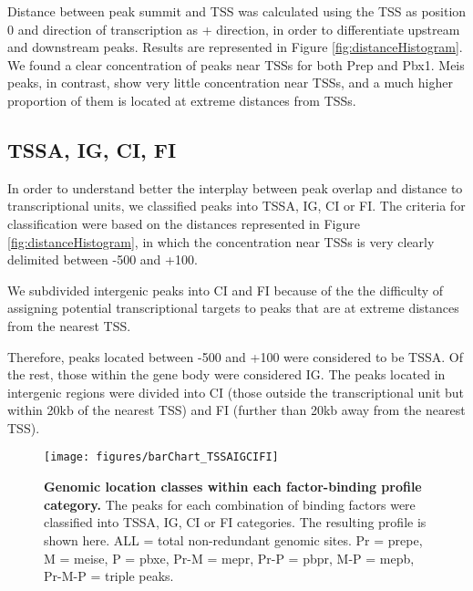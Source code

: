 Distance between peak summit and \ac{TSS} was calculated using the \ac{TSS} as position 0 and direction of transcription as + direction, in order to differentiate upstream and downstream peaks. Results are represented in Figure \ref{fig:distanceHistogram}. We found a clear concentration of peaks near \ac{TSS}s for both Prep and Pbx1. Meis peaks, in contrast, show very little concentration near \acp{TSS}, and a much higher proportion of them is located at extreme distances from \acp{TSS}. 

\subsection{TSSA, IG, CI, FI}

In order to understand better the interplay between peak overlap and distance to transcriptional units, we classified peaks into \ac{TSSA}, \ac{IG}, \ac{CI} or \ac{FI}. The criteria for classification were based on the  distances represented in Figure \ref{fig:distanceHistogram}, in which the concentration near \acp{TSS} is very clearly delimited between -500 and +100. 

We subdivided intergenic peaks into \ac{CI} and \ac{FI} because of the the difficulty of assigning potential transcriptional targets to peaks that are at extreme distances from the nearest \ac{TSS}.%

Therefore, peaks located between -500 and +100 were considered to be \ac{TSSA}. Of the rest, those within the gene body were considered \ac{IG}. The peaks located in intergenic regions were divided into \ac{CI} (those outside the transcriptional unit but within 20kb of the nearest \ac{TSS}) and \ac{FI} (further than 20kb away from the nearest \ac{TSS}). 

\begin{figure}[]
  \centering
  \texttt{[image: figures/barChart\_TSSAIGCIFI]}
  \caption[Genomic location classes within each factor-binding profile category]{\textbf{Genomic location classes within each factor-binding profile category.} The peaks for each combination of binding factors were classified into \ac{TSSA}, \ac{IG}, \ac{CI} or \ac{FI} categories. The resulting profile is shown here. ALL = total non-redundant genomic sites. Pr = \ac{prepe}, M = \ac{meise}, P = \ac{pbxe}, Pr-M = \ac{mepr}, Pr-P = \ac{pbpr}, M-P = \ac{mepb}, Pr-M-P = triple peaks.}
  \label{fig:distanceBarChart}
\end{figure}

